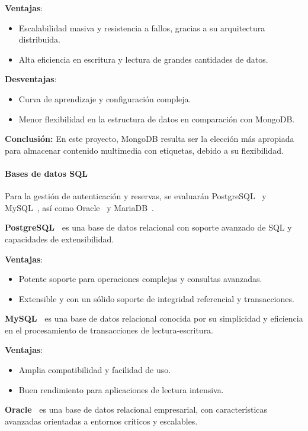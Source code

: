 \textbf{Ventajas}:
\begin{itemize}
\item Escalabilidad masiva y resistencia a fallos, gracias a su arquitectura distribuida.
\item Alta eficiencia en escritura y lectura de grandes cantidades de datos.
\end{itemize}

\textbf{Desventajas}:
\begin{itemize}
\item Curva de aprendizaje y configuración compleja.
\item Menor flexibilidad en la estructura de datos en comparación con MongoDB.
\end{itemize}

\textbf{Conclusión:} En este proyecto, MongoDB resulta ser la elección más apropiada para almacenar contenido multimedia con etiquetas, debido a su flexibilidad.

\paragraph{Bases de datos SQL}
Para la gestión de autenticación y reservas, se evaluarán PostgreSQL~\cite{postgresql} y MySQL~\cite{mysql}, así como Oracle~\cite{oracle} y MariaDB~\cite{mariadb}.

\textbf{PostgreSQL~\cite{postgresql}} es una base de datos relacional con soporte avanzado de SQL y capacidades de extensibilidad.

\textbf{Ventajas}:
\begin{itemize}
\item Potente soporte para operaciones complejas y consultas avanzadas.
\item Extensible y con un sólido soporte de integridad referencial y transacciones.
\end{itemize}

\textbf{MySQL~\cite{mysql}} es una base de datos relacional conocida por su simplicidad y eficiencia en el procesamiento de transacciones de lectura-escritura.

\textbf{Ventajas}:
\begin{itemize}
\item Amplia compatibilidad y facilidad de uso.
\item Buen rendimiento para aplicaciones de lectura intensiva.
\end{itemize}

\textbf{Oracle~\cite{oracle}} es una base de datos relacional empresarial, con características avanzadas orientadas a entornos críticos y escalables.

